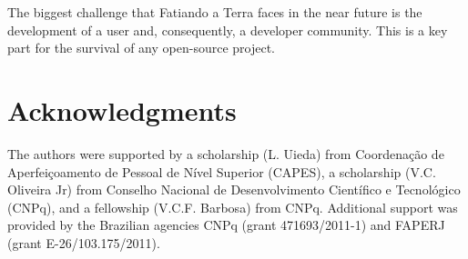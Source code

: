 The biggest challenge that Fatiando a Terra faces in the near future is
the development of a user and, consequently, a developer community. This
is a key part for the survival of any open-source project.




\section{Acknowledgments}

The authors were supported by a scholarship (L. Uieda) from Coordenação de
Aperfeiçoamento de Pessoal de Nível Superior (CAPES), a scholarship (V.C.
Oliveira Jr) from Conselho Nacional de Desenvolvimento Científico e Tecnológico
(CNPq), and a fellowship (V.C.F. Barbosa) from CNPq.  Additional support was
provided by the Brazilian agencies CNPq (grant 471693/2011-1) and FAPERJ (grant
E-26/103.175/2011).
